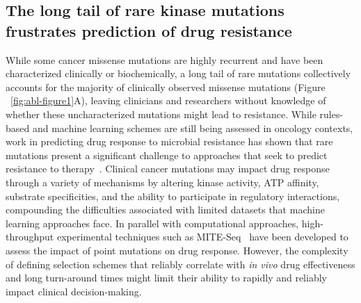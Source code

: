 \documentclass[phd,tocprelim]{cornell}
\begin{document}
\subsection{The long tail of rare kinase mutations frustrates prediction of drug resistance}
While some cancer missense mutations are highly recurrent and have been characterized clinically or biochemically, a long tail of rare mutations collectively accounts for the majority of clinically observed missense mutations (Figure ~\ref{fig:abl-figure1}A), leaving clinicians and researchers without knowledge of whether these uncharacterized mutations might lead to resistance.
While rules-based and machine learning schemes are still being assessed in oncology contexts, work in predicting drug response to microbial resistance has shown that rare mutations present a significant challenge to approaches that seek to predict resistance to therapy~\citep{Pesesky:Front.Microbiol.:2016}.
Clinical cancer mutations may impact drug response through a variety of mechanisms by altering kinase activity, ATP affinity, substrate specificities, and the ability to participate in regulatory interactions, compounding the difficulties associated with limited datasets that machine learning approaches face.
In parallel with computational approaches, high-throughput experimental techniques such as MITE-Seq~\citep{Melnikov:NucleicAcidsRes.:2014} have been developed to assess the impact of point mutations on drug response. 
However, the complexity of defining selection schemes that reliably correlate with \emph{in vivo} drug effectiveness and long turn-around times might limit their ability to rapidly and reliably impact clinical decision-making.	
\end{document}
